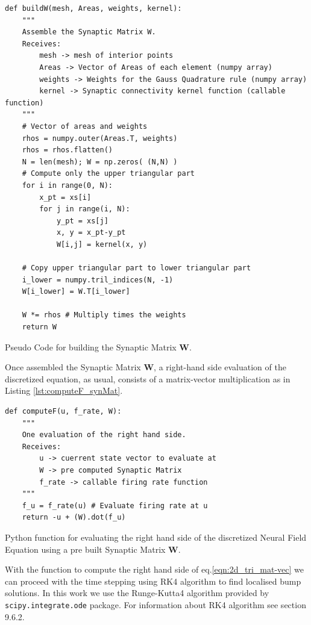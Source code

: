 \documentclass{uonmathreport}
\begin{document}
\begin{listing}[H]
		\begin{verbatim}
def buildW(mesh, Areas, weights, kernel):
	"""
	Assemble the Synaptic Matrix W.
	Receives:
		mesh -> mesh of interior points
		Areas -> Vector of Areas of each element (numpy array)
		weights -> Weights for the Gauss Quadrature rule (numpy array)
		kernel -> Synaptic connectivity kernel function (callable function)
	"""
	# Vector of areas and weights
	rhos = numpy.outer(Areas.T, weights)
	rhos = rhos.flatten()
	N = len(mesh); W = np.zeros( (N,N) )
	# Compute only the upper triangular part
	for i in range(0, N):
		x_pt = xs[i]
		for j in range(i, N):
			y_pt = xs[j]
			x, y = x_pt-y_pt
			W[i,j] = kernel(x, y) 
	
	# Copy upper triangular part to lower triangular part
	i_lower = numpy.tril_indices(N, -1)
	W[i_lower] = W.T[i_lower]
	
	W *= rhos # Multiply times the weights
	return W
		\end{verbatim}	
	\caption{Pseudo Code for building the Synaptic Matrix $\mathbf{W}$.}
	\label{lst:buildW}
\end{listing}

Once assembled the Synaptic Matrix $\mathbf{W}$, a right-hand side evaluation of the discretized equation, as usual, consists of a matrix-vector multiplication as in Listing \ref{lst:computeF_synMat}.

\begin{listing}[H]
		\begin{verbatim}
def computeF(u, f_rate, W):
	"""
	One evaluation of the right hand side.
	Receives:
		u -> cuerrent state vector to evaluate at
		W -> pre computed Synaptic Matrix
		f_rate -> callable firing rate function
	"""
	f_u = f_rate(u) # Evaluate firing rate at u
	return -u + (W).dot(f_u)

		\end{verbatim}	
	\caption{Python function for evaluating the right hand side of the discretized Neural Field Equation using a pre built Synaptic Matrix $\mathbf{W}$.}
	\label{lst:computeF_synMat}
\end{listing}

With the function to compute the right hand side of eq.\ref{eqn:2d_tri_mat-vec} we can proceed with the time stepping using RK4 algorithm to find localised bump solutions. In this work we use the Runge-Kutta4 algorithm provided by \texttt{scipy.integrate.ode} package. For information about RK4 algorithm see \cite{heath2002scientific} section 9.6.2.
\end{document}
